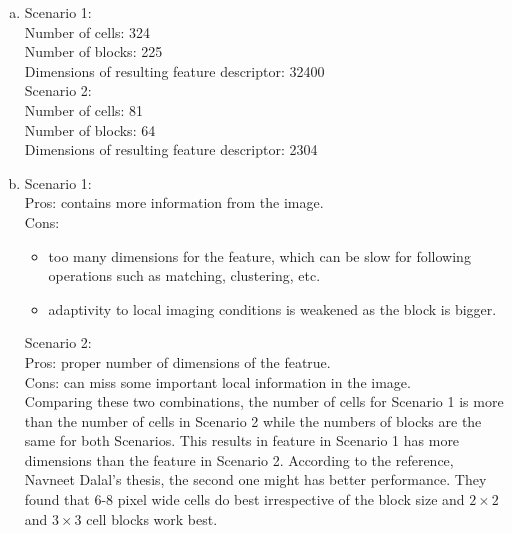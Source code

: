 \begin{enumerate}[(a)]
    \item Scenario 1:
          \\
          Number of cells: 324
          \\
          Number of blocks: 225
          \\
          Dimensions of resulting feature descriptor: 32400
          \\


          Scenario 2:
          \\
          Number of cells: 81
          \\
          Number of blocks: 64
          \\
          Dimensions of resulting feature descriptor: 2304
          \\

    \item Scenario 1: \\
          Pros: contains more information from the image. \\
          Cons: \begin{itemize}
              \item too many dimensions for the feature, which can be slow for following operations such as matching, clustering, etc.
              \item adaptivity to local imaging conditions is weakened as the block is bigger.
          \end{itemize}
          Scenario 2: \\
          Pros: proper number of dimensions of the featrue. \\
          Cons: can miss some important local information in the image. \\


          Comparing these two combinations, the number of cells for Scenario 1 is more than the number of cells in Scenario 2 while the numbers of blocks are the same for both Scenarios. This results in feature in Scenario 1 has more dimensions than the feature in Scenario 2. According to the reference, Navneet Dalal's thesis, the second one might has better performance. They found that 6-8 pixel wide cells do best irrespective of the block size and $2\times 2$ and $3\times 3$ cell blocks work best.
\end{enumerate}



% 


